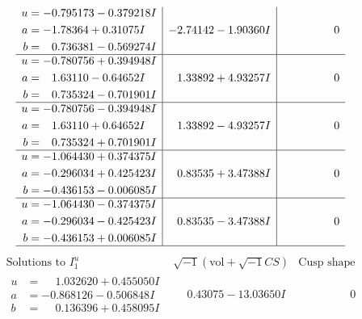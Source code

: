 \documentclass[1p]{elsarticle_modified}
\theoremstyle{definition}
\newcommand{\I}{\sqrt{-1}}
\begin{document}
$$\begin{array}{c|c|c}
\begin{aligned}
u &= -0.795173 - 0.379218 I \\
a &= -1.78364 + 0.31075 I \\
b &= \phantom{-}0.736381 - 0.569274 I\end{aligned}
 & -2.74142 - 1.90360 I & \phantom{-0.000000 } 0 \\ \hline\begin{aligned}
u &= -0.780756 + 0.394948 I \\
a &= \phantom{-}1.63110 - 0.64652 I \\
b &= \phantom{-}0.735324 - 0.701901 I\end{aligned}
 & \phantom{-}1.33892 + 4.93257 I & \phantom{-0.000000 } 0 \\ \hline\begin{aligned}
u &= -0.780756 - 0.394948 I \\
a &= \phantom{-}1.63110 + 0.64652 I \\
b &= \phantom{-}0.735324 + 0.701901 I\end{aligned}
 & \phantom{-}1.33892 - 4.93257 I & \phantom{-0.000000 } 0 \\ \hline\begin{aligned}
u &= -1.064430 + 0.374375 I \\
a &= -0.296034 + 0.425423 I \\
b &= -0.436153 - 0.006085 I\end{aligned}
 & \phantom{-}0.83535 + 3.47388 I & \phantom{-0.000000 } 0 \\ \hline\begin{aligned}
u &= -1.064430 - 0.374375 I \\
a &= -0.296034 - 0.425423 I \\
b &= -0.436153 + 0.006085 I\end{aligned}
 & \phantom{-}0.83535 - 3.47388 I & \phantom{-0.000000 } 0\\
 \hline 
 \end{array}$$\newpage$$\begin{array}{c|c|c}  
\text{Solutions to }I^u_{1}& \I (\text{vol} + \sqrt{-1}CS) & \text{Cusp shape}\\
 \hline 
\begin{aligned}
u &= \phantom{-}1.032620 + 0.455050 I \\
a &= -0.868126 - 0.506848 I \\
b &= \phantom{-}0.136396 + 0.458095 I\end{aligned}
 & \phantom{-}0.43075 - 13.03650 I & \phantom{-0.000000 } 0 \\ \hline\begin{aligned}

\end{aligned}
\end{array}$$
\end{document}
